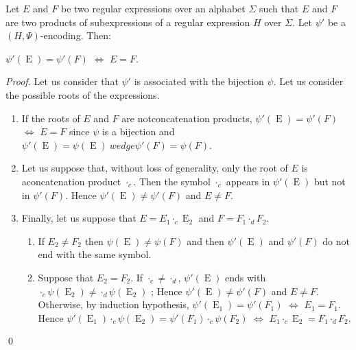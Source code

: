 \documentclass{llncs}
\DeclareMathOperator{\E}{E}
\begin{document}
\begin{lemma}\label{lem egal psi egal exp}
  Let $E$ and $F$ be two regular expressions over an alphabet $\Sigma$ such that $E$ and $F$ are two products of subexpressions of a regular expression $H$ over $\Sigma$. Let $\psi'$ be a $(H,\Psi)$-encoding. Then:
  
  \centerline{
    $\psi'(\E)=\psi'(F)$ $\Leftrightarrow$ $E=F$.
  }
\end{lemma}
\begin{proof}
  Let us consider that $\psi'$ is associated with the bijection $\psi$. Let us consider the possible roots of the expressions.
  \begin{enumerate}
    \item If the roots of $E$ and $F$ are notconcatenation products, $\psi'(\E)=\psi'(F)$ $\Leftrightarrow$ $E=F$ since $\psi$ is a bijection and $\psi'(\E)=\psi(\E)\ wedge \psi'(F)=\psi(F)$.
  
    \item Let us suppose that, without loss of generality, only the root of $E$ is aconcatenation product $\cdot_c$. Then the symbol $\cdot_c$ appears in $\psi'(\E)$ but not in $\psi'(F)$. Hence $\psi'(\E)\neq \psi'(F)$ and $E\neq F$.
  
    \item Finally, let us suppose that $E=E_1\cdot_c \E_2$ and $F=F_1\cdot_d F_2$. 
    \begin{enumerate}
      \item If $E_2\neq F_2$ then $\psi(\E)\neq \psi(F)$ and then $\psi'(\E)$ and $\psi'(F)$ do not end with the same symbol.
      \item Suppose that $E_2=F_2$. If $\cdot_c\neq \cdot_d$, $\psi'(\E)$ ends with $\cdot_c \psi(\E_2)\neq \cdot_d \psi(\E_2)$ ; Hence $\psi'(\E)\neq \psi'(F)$ and $E\neq F$. Otherwise, by induction hypothesis, $\psi'(\E_1)=\psi'(F_1)$ $\Leftrightarrow$ $E_1=F_1$. Hence $\psi'(\E_1)\cdot_c \psi(\E_2)=\psi'(F_1)\cdot_c \psi(F_2)$ $\Leftrightarrow$ $E_1\cdot_c \E_2=F_1\cdot_d F_2$.
    \end{enumerate}
  \end{enumerate}
  \qed
\end{proof}
\end{document}
